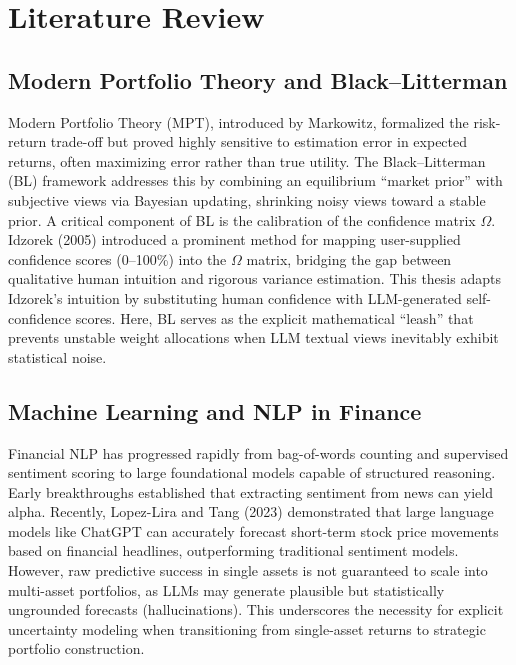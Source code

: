 \documentclass[12pt]{report}
\begin{document}
\chapter{Literature Review}
\section{Modern Portfolio Theory and Black--Litterman}
Modern Portfolio Theory (MPT), introduced by Markowitz, formalized the risk-return trade-off but proved highly sensitive to estimation error in expected returns, often maximizing error rather than true utility.
The Black--Litterman (BL) framework \cite{blacklitterman} addresses this by combining an equilibrium ``market prior'' with subjective views via Bayesian updating, shrinking noisy views toward a stable prior.
A critical component of BL is the calibration of the confidence matrix $\Omega$. Idzorek (2005) \cite{idzorek} introduced a prominent method for mapping user-supplied confidence scores (0--100\%) into the $\Omega$ matrix, bridging the gap between qualitative human intuition and rigorous variance estimation. This thesis adapts Idzorek's intuition by substituting human confidence with LLM-generated self-confidence scores. Here, BL serves as the explicit mathematical ``leash'' that prevents unstable weight allocations when LLM textual views inevitably exhibit statistical noise.

\section{Machine Learning and NLP in Finance}
Financial NLP has progressed rapidly from bag-of-words counting and supervised sentiment scoring to large foundational models capable of structured reasoning.
Early breakthroughs established that extracting sentiment from news can yield alpha. Recently, Lopez-Lira and Tang (2023) \cite{lopezlira} demonstrated that large language models like ChatGPT can accurately forecast short-term stock price movements based on financial headlines, outperforming traditional sentiment models.
However, raw predictive success in single assets is not guaranteed to scale into multi-asset portfolios, as LLMs may generate plausible but statistically ungrounded forecasts (hallucinations). This underscores the necessity for explicit uncertainty modeling when transitioning from single-asset returns to strategic portfolio construction.
\end{document}
